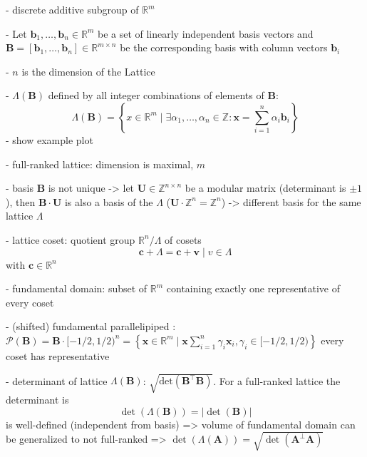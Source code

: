 \documentclass[
  a4paper,  %
  twoside,  %
  bibliography=totoc,
  headsepline,
  cleardoublepage=empty,
  parskip=half,
  draft=false
]{scrbook}
\begin{document}
- discrete additive subgroup of $\mathbb{R}^m$ %

- Let $\mathbf{b}_1, \ldots, \mathbf{b}_n \in \mathbb{R}^m$ be a set of linearly independent basis vectors and $\mathbf{B} = \left[\mathbf{b}_1, \ldots, \mathbf{b}_n\right] \in \mathbb{R}^{m\times n}$ be the corresponding basis with column vectors $\mathbf{b}_i$

- $n$ is the dimension of the Lattice

- $\Lambda(\mathbf{B})$ defined by all integer combinations of elements of $\mathbf{B}$:
\begin{equation}
  \Lambda(\mathbf{B}) = \left\{ x \in \mathbb{R}^m \mid \exists \alpha_1, \ldots, \alpha_n \in \mathbb{Z} : \mathbf{x} = \sum_{i=1}^n \alpha_i \mathbf{b}_i \right\}
\end{equation}
- show example plot %

- full-ranked lattice: dimension is maximal, $m$

- basis $\mathbf{B}$ is not unique -> let $\mathbf{U}\in \mathbb{Z}^{n\times n}$ be a modular matrix (determinant is $\pm1$), then $\mathbf{B}\cdot \mathbf{U}$ is also a basis of the $\Lambda$ ($\mathbf{U} \cdot \mathbb{Z}^{n} = \mathbb{Z}^{n}$) -> different basis for the same lattice $\Lambda$

- lattice coset:
quotient group $\mathbb{R}^n/\Lambda$ of cosets
\begin{equation*}
  \mathbf{c} + \Lambda = {\mathbf{c} + \mathbf{v} \mid v \in \Lambda}
\end{equation*}
with $\mathbf{c} \in \mathbb{R}^n$ %

- fundamental domain: subset of $\mathbb{R}^m$ containing exactly one representative of every coset

- (shifted) fundamental parallelipiped \label{eq:fundamental-parallelipiped}: $\mathcal{P}(\mathbf{B}) = \mathbf{B} \cdot [ - 1/2, 1/2)^n = \left\{ \mathbf{x} \in \mathbb{R}^m \mid \mathbf{x} \sum_{i=1}^n \gamma_i \mathbf{x}_i, \gamma_i \in  [ - 1/2, 1/2) \right\}$ every coset has representative  %

- determinant of lattice $\Lambda(\mathbf{B})$: $\sqrt{\text{det}\left(\mathbf{B}^\intercal \mathbf{B}\right)}$. For a full-ranked lattice the determinant is
\begin{equation}
  \det(\Lambda(\mathbf{B})) = |\det(\mathbf{B})|
\end{equation}
is well-defined (independent from basis) => volume of fundamental domain %
can be generalized to not full-ranked => $\det(\Lambda(\mathbf{A})) = \sqrt{\det(\mathbf{A}^\perp \mathbf{A})}$ %
\end{document}

